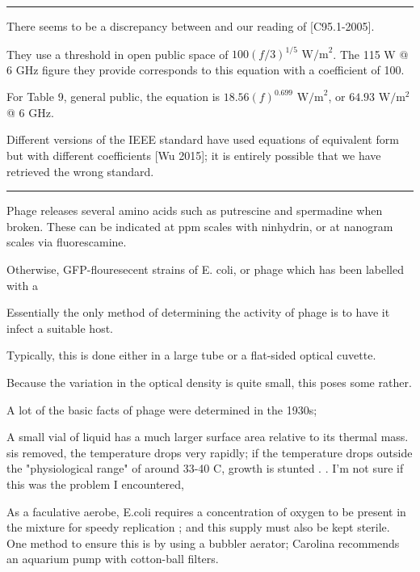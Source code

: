 \documentclass[paper.tex]{subfiles}
\begin{document}
\clearpage
\rule{\linewidth}{0.2pt}

There seems to be a discrepancy between \cite{Efficient2015} and our reading of [C95.1-2005].

They use a threshold in open public space of $100(f/3)^{1/5} \text{ W/m}^2$. The 115 W @ 6 GHz figure they provide corresponds to this equation with a coefficient of 100.

For Table 9, general public, the equation is $18.56 (f)^{0.699} \text{ W/m}^2$, or $64.93 \text{ W}/\text{m}^2$ @ 6 GHz. 

Different versions of the IEEE standard have used equations of equivalent form but with different coefficients [Wu 2015]; it is entirely possible that we have retrieved the wrong standard.

\rule{\linewidth}{0.2pt}





Phage releases several amino acids such as putrescine and spermadine when broken. These can be indicated at ppm scales with ninhydrin, or at nanogram scales via fluorescamine. 

Otherwise, GFP-flouresecent strains of E. coli, or phage which has been labelled with a 






Essentially the only method of determining the activity of phage is to have it infect a suitable host.

Typically, this is done either in a large tube or a flat-sided optical cuvette.

Because the variation in the optical density is quite small, this poses some rather. 

A lot of the basic facts of phage were determined in the 1930s; 

A small vial of liquid has a much larger surface area relative to its thermal mass. sis removed, the temperature drops very rapidly; if the temperature drops outside the "physiological range" of around 33-40 C, growth is stunted \cite{effect2003}. \cite{growth1946}. I'm not sure if this was the problem I encountered, 

As a faculative aerobe, E.coli requires a concentration of oxygen to be present in the mixture for speedy replication \cite{Effect1965}; and this supply must also be kept sterile. One method to ensure this is by using a bubbler aerator; Carolina recommends an aquarium pump with cotton-ball filters. 
\end{document}
